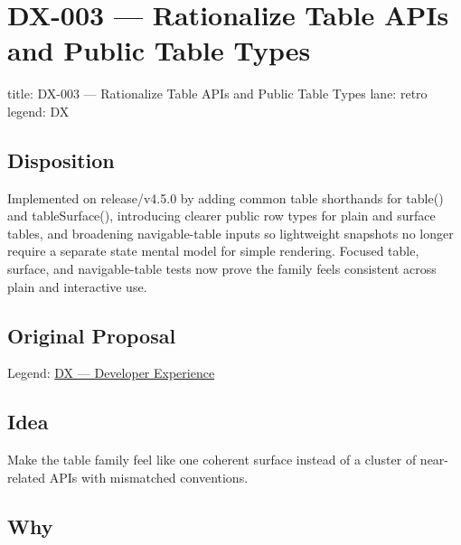 \chapter{DX-003 --- Rationalize Table APIs and Public Table Types}\label{record-335}

\smallskip

\begin{RecordMeta}
title: DX-003 — Rationalize Table APIs and Public Table Types
lane: retro
legend: DX

\end{RecordMeta}

\section{Disposition}\label{record-335-disposition}

Implemented on release/v4.5.0 by adding common table shorthands for table() and tableSurface(), introducing clearer public row types for plain and surface tables, and broadening navigable-table inputs so lightweight snapshots no longer require a separate state mental model for simple rendering. Focused table, surface, and navigable-table tests now prove the family feels consistent across plain and interactive use.

\section{Original Proposal}\label{record-335-original-proposal}

Legend: \href{https://github.com/flyingrobots/bijou/blob/1853ad902f6bf219326409e7f743a5a1d6517dbc/docs/method/legends/DX-developer-experience.md}{DX --- Developer Experience}

\section{Idea}\label{record-335-idea}

Make the table family feel like one coherent surface instead of a cluster of near-related APIs with mismatched conventions.

\section{Why}\label{record-335-why}

